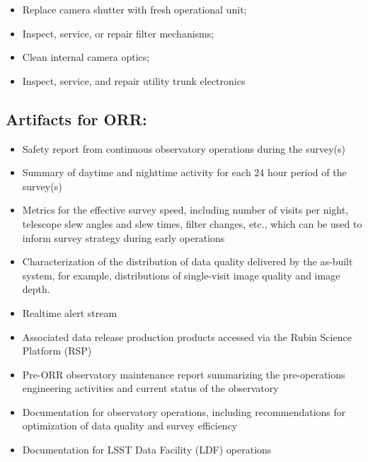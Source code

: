 \begin{itemize}
\item Replace camera shutter with fresh operational unit;
\item Inspect, service, or repair filter mechanisms;
\item Clean internal camera optics;
\item Inspect, service, and repair utility trunk electronics
\end{itemize}

\subsection{Artifacts for ORR:}

\begin{itemize}
\item Safety report from continuous observatory operations during the survey(s)
\item Summary of daytime and nighttime activity for each 24 hour period of the survey(s)
\item Metrics for the effective survey speed, including number of visits per night, telescope slew angles and slew times, filter changes, etc., which can be used to inform survey strategy during early operations
\item Characterization of the distribution of data quality delivered by the as-built system, for example, distributions of single-visit image quality and image depth.
\item Realtime alert stream
\item Associated data release production products accessed via the Rubin Science Platform (RSP)
\item Pre-ORR observatory maintenance report summarizing the pre-operations engineering activities and current status of the observatory
\item Documentation for observatory operations, including recommendations for optimization of data quality and survey efficiency
\item Documentation for LSST Data Facility (LDF) operations
\end{itemize}

